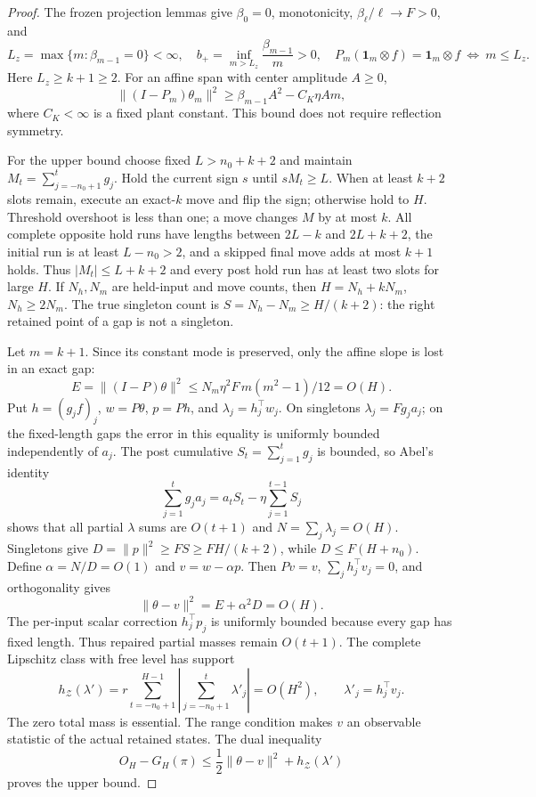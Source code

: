 \documentclass[11pt]{article}
\begin{document}
\begin{proof}
The frozen projection lemmas give $\beta_0=0$, monotonicity,
$\beta_\ell/\ell\to F>0$, and
\[
L_z=\max\{m:\beta_{m-1}=0\}<\infty,\quad
b_+=\inf_{m>L_z}\frac{\beta_{m-1}}m>0,\quad
P_m(\mathbf1_m\otimes f)=\mathbf1_m\otimes f
\ \Longleftrightarrow\ m\le L_z .
\]
Here $L_z\ge k+1\ge2$. For an affine span with center amplitude $A\ge0$,
\[
\|(I-P_m)\theta_m\|^2
\ge \beta_{m-1}A^2-C_K\eta Am ,
\]
where $C_K<\infty$ is a fixed plant constant. This bound does not
require reflection symmetry.

For the upper bound choose fixed $L>n_0+k+2$ and maintain
$M_t=\sum_{j=-n_0+1}^t g_j$.
Hold the current sign $s$ until $sM_t\ge L$.
When at least $k+2$ slots remain, execute an exact-$k$ move and flip
the sign; otherwise hold to $H$.
Threshold overshoot is less than one; a move changes $M$ by at most $k$.
All complete opposite hold runs have lengths between
$2L-k$ and $2L+k+2$, the initial run is at least $L-n_0>2$,
and a skipped final move adds at most $k+1$ holds.
Thus $|M_t|\le L+k+2$ and every post hold run has at least two slots
for large $H$. If $N_h,N_m$ are held-input and move counts, then
$H=N_h+kN_m$, $N_h\ge2N_m$.
The true singleton count is $S=N_h-N_m\ge H/(k+2)$:
the right retained point of a gap is not a singleton.

Let $m=k+1$. Since its constant mode is preserved, only the affine
slope is lost in an exact gap:
\[
E=\|(I-P)\theta\|^2
\le N_m\eta^2F\,m(m^2-1)/12=O(H).
\]
Put $h=(g_jf)_j$, $w=P\theta$, $p=Ph$, and
$\lambda_j=h_j^\top w_j$.
On singletons $\lambda_j=Fg_ja_j$; on the fixed-length gaps the
error in this equality is uniformly bounded independently of $a_j$.
The post cumulative $S_t=\sum_{j=1}^t g_j$ is bounded, so Abel's identity
\[
\sum_{j=1}^t g_ja_j=a_tS_t-\eta\sum_{j=1}^{t-1}S_j
\]
shows that all partial $\lambda$ sums are $O(t+1)$ and
$N=\sum_j\lambda_j=O(H)$.
Singletons give $D=\|p\|^2\ge FS\ge FH/(k+2)$, while
$D\le F(H+n_0)$.
Define $\alpha=N/D=O(1)$ and $v=w-\alpha p$.
Then $Pv=v$, $\sum_jh_j^\top v_j=0$, and orthogonality gives
\[
\|\theta-v\|^2=E+\alpha^2D=O(H).
\]
The per-input scalar correction $h_j^\top p_j$ is uniformly bounded
because every gap has fixed length. Thus repaired partial masses
remain $O(t+1)$.
The complete Lipschitz class with free level has support
\[
h_{\mathcal Z}(\lambda')
=r\sum_{t=-n_0+1}^{H-1}
 \left|\sum_{j=-n_0+1}^t\lambda'_j\right|=O(H^2),
\qquad \lambda'_j=h_j^\top v_j .
\]
The zero total mass is essential. The range condition makes $v$
an observable statistic of the actual retained states.
The dual inequality
\[
O_H-G_H(\pi)\le
\frac12\|\theta-v\|^2+h_{\mathcal Z}(\lambda')
\]
proves the upper bound.


\end{proof}
\end{document}
